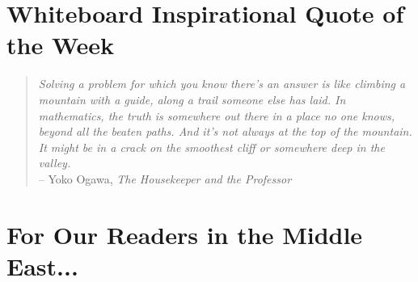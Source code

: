 \documentclass[12pt]{article}
\begin{document}
\newpage
\section*{Whiteboard Inspirational Quote of the Week}
\begin{quote}
\textit{Solving a problem for which you know there's an answer is like climbing a mountain with a guide, along a trail someone else has laid. In mathematics, the truth is somewhere out there in a place no one knows, beyond all the beaten paths. And it's not always at the top of the mountain. It might be in a crack on the smoothest cliff or somewhere deep in the valley.} \\-- Yoko Ogawa, \textit{The Housekeeper and the Professor}
\end{quote} 

\section*{For Our Readers in the Middle East...}
\end{document}
